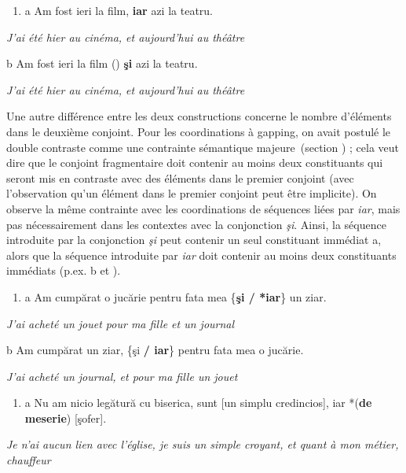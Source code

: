 \begin{enumerate}
\item \label{bkm:Ref302402908}a  Am fost ieri la film, {\textbar} \textbf{iar} azi la teatru.


\end{enumerate}
{\itshape
J'ai été hier au cinéma, et aujourd'hui au théâtre}

  b  Am fost ieri la film ({\textbar}) \textbf{şi} azi la teatru.

{\itshape
J'ai été hier au cinéma, et aujourd'hui au théâtre}

Une autre différence entre les deux constructions concerne le nombre d'éléments dans le deuxième conjoint. Pour les coordinations à gapping, on avait postulé le double contraste comme une contrainte sémantique majeure~(section ) ; cela veut dire que le conjoint fragmentaire doit contenir au moins deux constituants qui seront mis en contraste avec des éléments dans le premier conjoint (avec l'observation qu'un élément dans le premier conjoint peut être implicite). On observe la même contrainte avec les coordinations de séquences liées par \textit{iar}, mais pas nécessairement dans les contextes avec la conjonction \textit{şi}. Ainsi, la séquence introduite par la conjonction \textit{şi} peut contenir un seul constituant immédiat a, alors que la séquence introduite par \textit{iar} doit contenir au moins deux constituants immédiats (p.ex. b et ). 


\begin{enumerate}
\item \label{bkm:Ref302403853}a  Am cumpărat o jucărie pentru fata mea \{\textbf{şi / *iar}\} un ziar.


\end{enumerate}
{\itshape
J'ai acheté un jouet pour ma fille et un journal}

  b  Am cumpărat un ziar, \{şi\textbf{ / iar}\} pentru fata mea o jucărie.

{\itshape
J'ai acheté un journal, et pour ma fille un jouet}


\begin{enumerate}
\item \label{bkm:Ref302404044}a  Nu am nicio legătură cu biserica, sunt [un simplu credincios], iar *(\textbf{de meserie}) [şofer].


\end{enumerate}
{\itshape
Je n'ai aucun lien avec l'église, je suis un simple croyant, et quant à mon métier, chauffeur}

